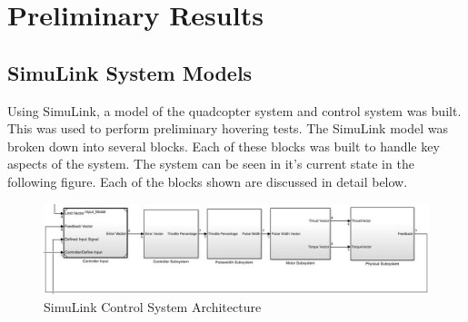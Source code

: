 \section{Preliminary Results}
\subsection{SimuLink System Models}
Using SimuLink, a model of the quadcopter system and control system was built.  This was used to perform preliminary hovering tests.  The SimuLink model was broken down into several blocks.  Each of these blocks was built to handle key aspects of the system.  The system can be seen in it's current state in the following figure.  Each of the blocks shown are discussed in detail below.

\begin{figure}[h]
  \centering
  \includegraphics[scale=0.45]{system_arch.jpg}
  \caption{SimuLink Control System Architecture}
  \label{fig:sys_arch}
\end{figure}


